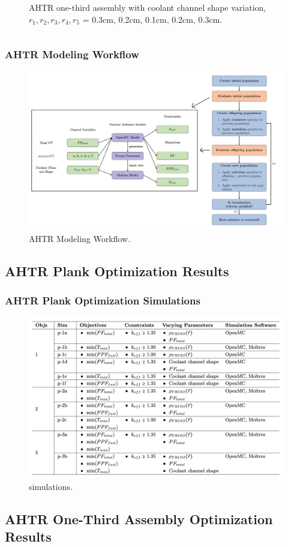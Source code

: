 \begin{frame}
\begin{columns}
\begin{column}{0.5\textwidth}
\begin{figure}
                \caption{AHTR one-third assembly with coolant channel shape variation, 
                $r_1, r_2, r_3, r_4, r_5$ = 0.3cm, 0.2cm, 0.1cm, 0.2cm, 0.3cm.}
            \end{figure}
        \end{column}
        \end{columns}
\end{frame}

\begin{frame}
    \frametitle{AHTR Modeling Workflow}
    \begin{figure}
        \includegraphics[width=0.95\linewidth]{figures/ahtr-modeling-workflow.png} 
        \caption{AHTR Modeling Workflow.}
    \end{figure}
\end{frame}

\subsection{AHTR Plank Optimization Results}
\frametitle{AHTR Plank Optimization Simulations}
\begin{frame}
\begin{figure}
    \includegraphics[width=0.95\linewidth]{figures/ahtr-plank-opt-table.png} 
    \caption{simulations.}
\end{figure}
\end{frame}

\subsection{AHTR One-Third Assembly Optimization Results}